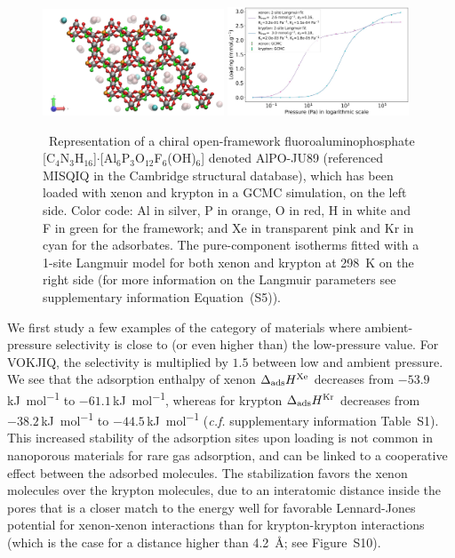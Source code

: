 \documentclass[main]{subfiles}
\begin{document}
  \begin{figure}[t]
  \centering
    \includegraphics[width=0.48\textwidth]{figures/2-thermo/MISQIQ_clean.jpg}\hfill
    \includegraphics[width=0.48\textwidth]{figures/2-thermo/MISQIQ_clean_isotherm_xenon_krypton_298K.jpg}
    \caption{\ Representation of a chiral open-framework fluoroaluminophosphate [C$_4$N$_3$H$_{16}$]$\cdot$[Al$_6$P$_3$O$_{12}$F$_6$(OH)$_6$] denoted AlPO-JU89 (referenced MISQIQ in the Cambridge structural database), which has been loaded with xenon and krypton in a GCMC simulation, on the left side.\cite{MISQIQ} Color code: Al in silver, P in orange, O in red, H in white and F in green for the framework; and Xe in transparent pink and Kr in cyan for the adsorbates. The pure-component isotherms fitted with a 1-site Langmuir model for both xenon and krypton at \SI{298}{\kelvin} on the right side (for more information on the Langmuir parameters see supplementary information Equation~(S5)).}
    \label{fgr:MISQIQ}
  \end{figure}
  
  We first study a few examples of the category of materials where ambient-pressure selectivity is close to (or even higher than) the low-pressure value. For VOKJIQ, the selectivity is multiplied by $1.5$ between low and ambient pressure. We see that the adsorption enthalpy of xenon $\Delta_{\text{ads}}H^{\text{Xe}}$ decreases from $-53.9$\,\si{\kilo\joule\per\mol} to $-61.1$\,\si{\kilo\joule\per\mol}, whereas for krypton $\Delta_{\text{ads}}H^{\text{Kr}}$ decreases from $-38.2$\,\si{\kilo\joule\per\mol} to $-44.5$\,\si{\kilo\joule\per\mol} (\emph{c.f.} supplementary information Table~S1). This increased stability of the adsorption sites upon loading is not common in nanoporous materials for rare gas adsorption, and can be linked to a cooperative effect between the adsorbed molecules. The stabilization favors the xenon molecules over the krypton molecules, due to an interatomic distance inside the pores that is a closer match to the energy well for favorable Lennard-Jones potential for xenon-xenon interactions than for krypton-krypton interactions (which is the case for a distance higher than \SI{4.2}{\angstrom}; see Figure~S10).
  
\end{document}
